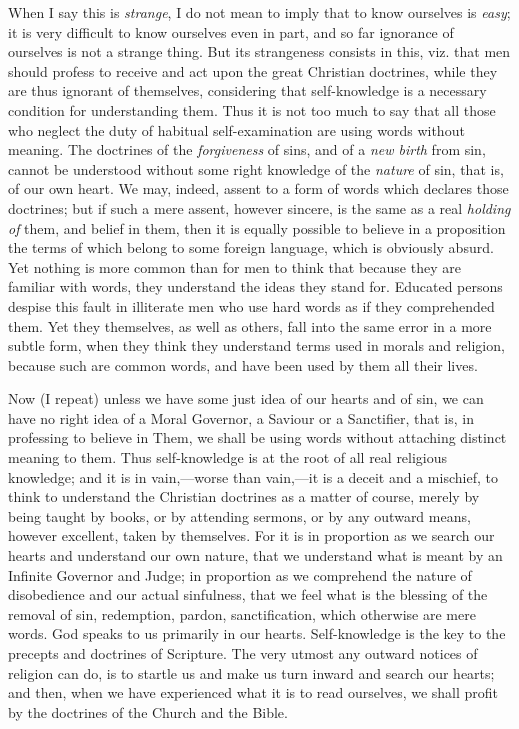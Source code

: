 When I say this is \emph{strange}, I do not mean to
imply that to know ourselves is \emph{easy}; it is very
difficult to know ourselves even in part, and so far
ignorance of ourselves is not a strange thing. But its
strangeness consists in this, viz. that men should
profess to receive and act upon the great Christian
doctrines, while they are thus ignorant of themselves,
considering that self-knowledge is a necessary condition
for understanding them. Thus it is not too much to say
that all those who neglect the duty of habitual
self-examination are using words without meaning. The
doctrines of the \emph{forgiveness} of sins, and of a \emph{new birth} from sin, cannot be understood without some
right knowledge of the \emph{nature} of sin, that is,
of our own heart. We may, indeed, assent to a form of
words which declares those doctrines; but if such a mere
assent, however sincere, is the same as a real \emph{holding
of} them, and belief in them, then it is equally
possible to believe in a proposition the terms of which
belong to some foreign language, which is obviously
absurd. Yet nothing is more common than for men to think
that because they are familiar with words, they
understand the ideas they stand for. Educated persons
despise this fault in illiterate men who use hard words
as if they comprehended them. Yet they themselves, as
well as others, fall into the same error in a more subtle
form, when they think they understand terms used in
morals and religion, because such are common words, and
have been used by them all their lives.

Now (I repeat) unless we have some just idea of our
hearts and of sin, we can have no right idea of a Moral Governor, a Saviour or a Sanctifier, that is, in
professing to believe in Them, we shall be using words
without attaching distinct meaning to them. Thus
self-knowledge is at the root of all real religious
knowledge; and it is in vain,—worse than
vain,—it is a deceit and a mischief, to think to
understand the Christian doctrines as a matter of course,
merely by being taught by books, or by attending sermons,
or by any outward means, however excellent, taken by
themselves. For it is in proportion as we search our
hearts and understand our own nature, that we understand
what is meant by an Infinite Governor and Judge; in
proportion as we comprehend the nature of disobedience
and our actual sinfulness, that we feel what is the
blessing of the removal of sin, redemption, pardon,
sanctification, which otherwise are mere words. God
speaks to us primarily in our hearts. Self-knowledge is
the key to the precepts and doctrines of Scripture. The
very utmost any outward notices of religion can do, is to
startle us and make us turn inward and search our hearts;
and then, when we have experienced what it is to read
ourselves, we shall profit by the doctrines of the Church
and the Bible.


